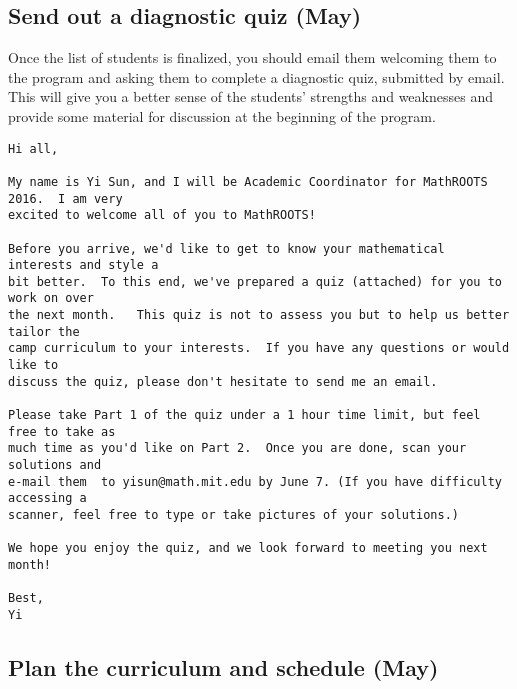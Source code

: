 \documentclass[10pt]{amsart}
\begin{document}
\subsection{Send out a diagnostic quiz (May)}

Once the list of students is finalized, you should email them welcoming them to the program and asking them to complete a diagnostic quiz, submitted by email.  This will give you a better sense of the students' strengths and weaknesses and provide some material for discussion at the beginning of the program.

\begin{center}
\begin{verbatim}
Hi all,

My name is Yi Sun, and I will be Academic Coordinator for MathROOTS 2016.  I am very 
excited to welcome all of you to MathROOTS!

Before you arrive, we'd like to get to know your mathematical interests and style a 
bit better.  To this end, we've prepared a quiz (attached) for you to work on over 
the next month.   This quiz is not to assess you but to help us better tailor the 
camp curriculum to your interests.  If you have any questions or would like to 
discuss the quiz, please don't hesitate to send me an email.

Please take Part 1 of the quiz under a 1 hour time limit, but feel free to take as 
much time as you'd like on Part 2.  Once you are done, scan your solutions and 
e-mail them  to yisun@math.mit.edu by June 7. (If you have difficulty accessing a 
scanner, feel free to type or take pictures of your solutions.)

We hope you enjoy the quiz, and we look forward to meeting you next month!

Best,
Yi
\end{verbatim}
\end{center}

\subsection{Plan the curriculum and schedule (May)}
\end{document}
